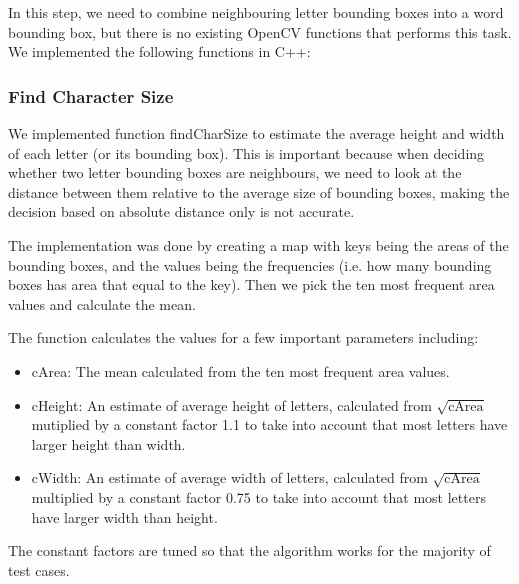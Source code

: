 \documentclass[conference]{IEEEtran}
\begin{document}
In this step, we need to combine neighbouring letter bounding boxes into a word bounding box, but there is no existing OpenCV functions that performs this task.  We implemented the following functions in C++:

\subsubsection{Find Character Size}
We implemented function findCharSize to estimate the average height and width of each letter (or its bounding box).  This is important because when deciding whether two letter bounding boxes are neighbours, we need to look at the distance between them relative to the average size of bounding boxes, making the decision based on absolute distance only is not accurate.

The implementation was done by creating a map with keys being the areas of the bounding boxes, and the values being the frequencies (i.e. how many bounding boxes has area that equal to the key).  Then we pick the ten most frequent area values and calculate the mean.

The function calculates the values for a few important parameters including:
\begin{itemize}
\item cArea: The mean calculated from the ten most frequent area values.
\item cHeight: An estimate of average height of letters, calculated from $\sqrt{\mbox{cArea}}$ mutiplied by a constant factor 1.1 to take into account that most letters have larger height than width.
\item cWidth: An estimate of average width of letters, calculated from $\sqrt{\mbox{cArea}}$ multiplied by a constant factor 0.75 to take into account that most letters have larger width than height.
\end{itemize}
The constant factors are tuned so that the algorithm works for the majority of test cases.
\end{document}
